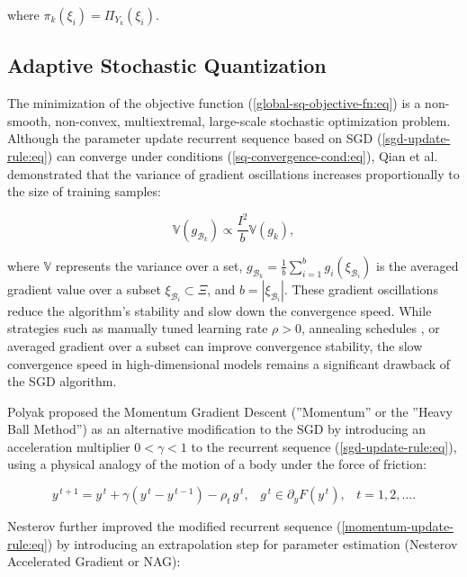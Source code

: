 where $\pi_k(\xi_i)=\Pi_{Y_k}(\xi_i)$.

\subsection{Adaptive Stochastic Quantization} \label{adap-stoch-quant:sec}

The minimization of the objective function (\ref{global-sq-objective-fn:eq}) is a non-smooth, non-convex, multiextremal, large-scale stochastic optimization problem. Although the parameter update recurrent sequence based on SGD (\ref{sgd-update-rule:eq}) can converge under conditions (\ref{sq-convergence-cond:eq}), Qian et al. \cite{qian2020} demonstrated that the variance of gradient oscillations increases proportionally to the size of training samples:

\begin{equation}
    \label{sgd-oscillations:eq}
        \mathbb{V} (g_{\mathcal{B}_k}) \propto \frac{I^2}{b} \mathbb{V} (g_k),
\end{equation}

\noindent where $\mathbb{V}$ represents the variance over a set, $g_{\mathcal{B}_k} = \frac{1}{b} \sum_{i=1}^{b} g_i (\xi_{\mathcal{B}_i})$ is the averaged gradient value over a subset $\xi_{\mathcal{B}_i} \subset \Xi$, and $b = | \xi_{\mathcal{B}_i} |$. These gradient oscillations reduce the algorithm's stability and slow down the convergence speed. While strategies such as manually tuned learning rate $\rho > 0$, annealing schedules \cite{Robbins_Monro_1951}, or averaged gradient over a subset can improve convergence stability, the slow convergence speed in high-dimensional models \cite{Norkin_Kozyriev_Norkin_2024} remains a significant drawback of the SGD algorithm.

Polyak \cite{Poliak_1987} proposed the Momentum Gradient Descent (''Momentum'' or the ''Heavy Ball Method'') as an alternative modification to the SGD by introducing an acceleration multiplier $0 < \gamma < 1$ to the recurrent sequence (\ref{sgd-update-rule:eq}), using a physical analogy of the motion of a body under the force of friction:

\begin{equation}
    \label{momentum-update-rule:eq}
        y^{\,t+1} = y^{\,t} + \gamma (y^{\,t} - y^{\,t-1}) - \rho_t \,g^{\,t},\;\;\; g^{\,t}\in \partial_y F(y^{\,t}),   \;\;\;t=1,2,\ldots.
\end{equation}

Nesterov \cite{nesterov1983method,walkington_2023} further improved the modified recurrent sequence (\ref{momentum-update-rule:eq}) by introducing an extrapolation step for parameter estimation (Nesterov Accelerated Gradient or NAG):

